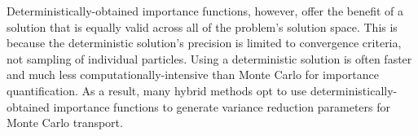 Deterministically-obtained importance functions, however,
offer the benefit of a solution that is equally valid across all of the problem's
solution space. This is because the deterministic solution's precision is
limited to convergence criteria, not sampling of individual particles. Using a
deterministic solution is often faster and much less computationally-intensive
than Monte Carlo for importance quantification.
As a result, many hybrid methods opt
to use deterministically-obtained importance functions to generate variance
reduction parameters for Monte Carlo transport.

